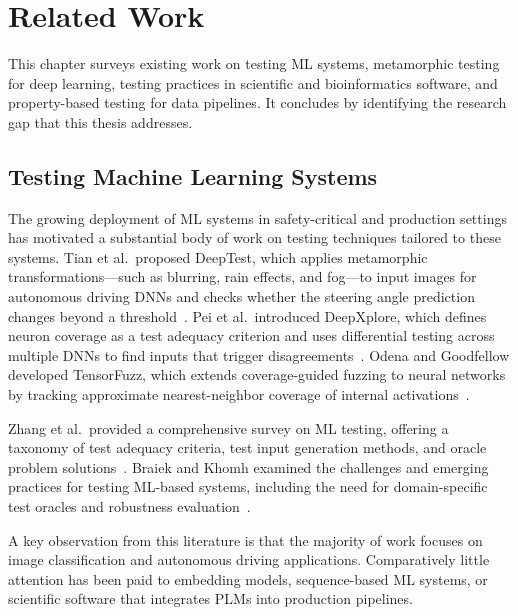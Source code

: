
\chapter{Related Work}\label{chapter:related-work}

This chapter surveys existing work on testing \ac{ML} systems, metamorphic testing for deep learning, testing practices in scientific and bioinformatics software, and property-based testing for data pipelines. It concludes by identifying the research gap that this thesis addresses.

\section{Testing Machine Learning Systems}\label{sec:rw-ml-testing}

The growing deployment of \ac{ML} systems in safety-critical and production settings has motivated a substantial body of work on testing techniques tailored to these systems. Tian et al.\ proposed DeepTest, which applies metamorphic transformations---such as blurring, rain effects, and fog---to input images for autonomous driving \ac{DNN}s and checks whether the steering angle prediction changes beyond a threshold~\cite{tian2018deeptest}. Pei et al.\ introduced DeepXplore, which defines neuron coverage as a test adequacy criterion and uses differential testing across multiple \ac{DNN}s to find inputs that trigger disagreements~\cite{pei2017deepxplore}. Odena and Goodfellow developed TensorFuzz, which extends coverage-guided fuzzing to neural networks by tracking approximate nearest-neighbor coverage of internal activations~\cite{odena2019tensorfuzz}.

Zhang et al.\ provided a comprehensive survey on \ac{ML} testing, offering a taxonomy of test adequacy criteria, test input generation methods, and oracle problem solutions~\cite{zhang2020machine}. Braiek and Khomh examined the challenges and emerging practices for testing \ac{ML}-based systems, including the need for domain-specific test oracles and robustness evaluation~\cite{braiek2020testing}.

A key observation from this literature is that the majority of work focuses on image classification and autonomous driving applications. Comparatively little attention has been paid to embedding models, sequence-based \ac{ML} systems, or scientific software that integrates \ac{PLM}s into production pipelines.


